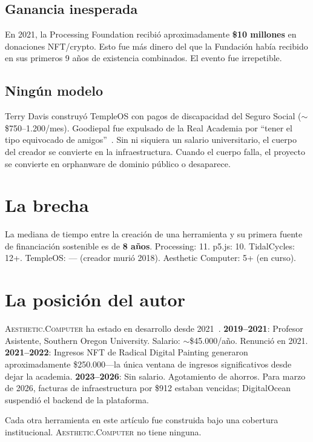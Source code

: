 \documentclass[10pt,letterpaper,twocolumn]{article}
\newcommand{\ac}{\textsc{Aesthetic.Computer}}
\begin{document}
\subsection{Ganancia inesperada}

En 2021, la Processing Foundation recibió aproximadamente \textbf{\$10 millones} en donaciones NFT/crypto. Esto fue más dinero del que la Fundación había recibido en sus primeros 9 años de existencia combinados. El evento fue irrepetible.

\subsection{Ningún modelo}

Terry Davis construyó TempleOS con pagos de discapacidad del Seguro Social ($\sim$\$750--1.200/mes). Goodiepal fue expulsado de la Real Academia por ``tener el tipo equivocado de amigos''~\citep{goodiepal2012elcamino}. Sin ni siquiera un salario universitario, el cuerpo del creador se convierte en la infraestructura. Cuando el cuerpo falla, el proyecto se convierte en orphanware de dominio público o desaparece.

\section{La brecha}

La mediana de tiempo entre la creación de una herramienta y su primera fuente de financiación sostenible es de \textbf{8 años}. Processing: 11. p5.js: 10. TidalCycles: 12+. TempleOS: --- (creador murió 2018). Aesthetic Computer: 5+ (en curso).

\section{La posición del autor}

\ac{} ha estado en desarrollo desde 2021~\citep{scudder2026ac}. \textbf{2019--2021}: Profesor Asistente, Southern Oregon University. Salario: $\sim$\$45.000/año. Renunció en 2021. \textbf{2021--2022}: Ingresos NFT de Radical Digital Painting generaron aproximadamente \$250.000---la única ventana de ingresos significativos desde dejar la academia. \textbf{2023--2026}: Sin salario. Agotamiento de ahorros. Para marzo de 2026, facturas de infraestructura por \$912 estaban vencidas; DigitalOcean suspendió el backend de la plataforma.

Cada otra herramienta en este artículo fue construida bajo una cobertura institucional. \ac{} no tiene ninguna.
\end{document}

